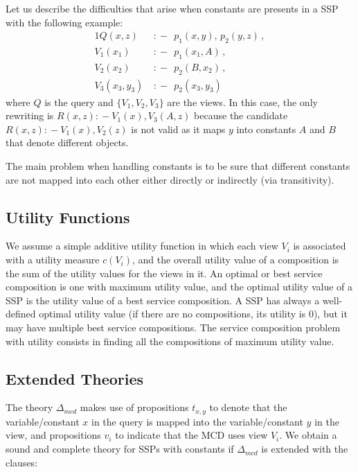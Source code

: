 \documentclass{llncs}
\newcommand{\qrule}{:\!\!-}
\begin{document}
Let us describe the difficulties that arise when constants
are presents in a SSP with the following example:
\begin{alignat*}{1}
Q(x,z)\ &\qrule\ \ p_1(x,y),\, p_2(y,z)\,, \\
V_1(x_1)\ &\qrule\ \ p_1(x_1,A)\,, \\
V_2(x_2)\ &\qrule\ \ p_2(B,x_2)\,, \\
V_3(x_3,y_3)\ &\qrule\ \ p_2(x_3,y_3)
\end{alignat*}
where $Q$ is the query and $\{V_1,V_2,V_3\}$ are the 
views. In this case, the only rewriting is 
$R(x,z)\qrule V_1(x),V_3(A,z)$ because the candidate 
$R(x,z)\qrule V_1(x),V_2(z)$ is not valid as it maps
$y$ into constants $A$ and $B$ that denote different
objects.

The main problem when handling constants is to
be sure that different constants are not mapped into
each other either directly or indirectly (via transitivity).

\subsection{Utility Functions}

We assume a simple additive utility function in which each view
$V_i$ is associated with a utility measure $c(V_i)$, and the overall utility value of
a composition is the sum of the utility values for the views in it.
An optimal or best service composition is one with maximum utility value,
and the optimal utility value of a SSP is the utility value of a best
service composition. A SSP has always a well-defined optimal
utility value (if there are no compositions, its utility is $0$),
but it may have multiple best service compositions.
The service composition problem with utility consists in finding
all the compositions of maximum utility value.



\subsection{Extended Theories}

The theory $\Delta_{mcd}$ makes use of propositions $t_{x,y}$
to denote that the variable/constant $x$ in the query is mapped
into the variable/constant $y$ in the view, and propositions $v_i$
to indicate that the MCD uses view $V_i$.
We obtain a sound and complete theory for SSPs with constants if
$\Delta_{mcd}$ is extended with the clauses:
\end{document}

